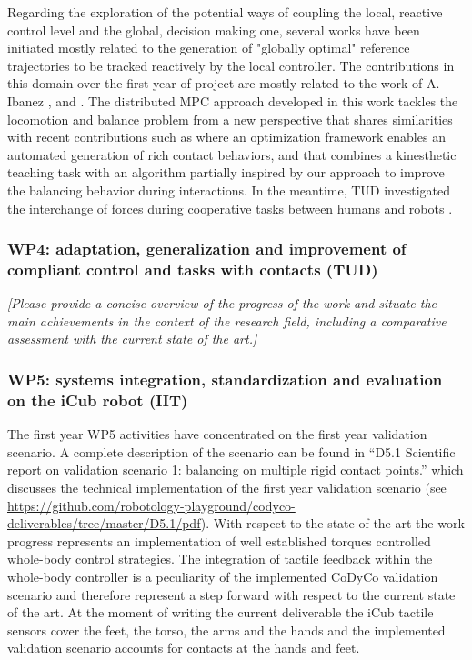 \documentclass[12pt,a4paper,twoside]{article}
\begin{document}
Regarding the exploration of the potential ways of coupling the local, reactive control level and the global, decision making one, several works have been initiated mostly related to the generation of "globally optimal" reference trajectories to be tracked reactively by the local controller. The contributions in this domain over the first year of project are mostly related to the work of A. Ibanez \cite{ibanez2013}, \cite{ibanez2014-icra} and \cite{ibanez2014-ark}. The distributed MPC approach developed in this work tackles the locomotion and balance problem from a new perspective that shares similarities with recent contributions such as \cite{mordatch2012} where an optimization framework enables an automated generation of rich contact behaviors, and \cite{ott2013} that combines a kinesthetic teaching task with an algorithm partially inspired by our approach to improve the balancing behavior during interactions. In the meantime, TUD investigated the interchange of forces during cooperative tasks between humans and robots \cite{berger2013}.

\subsubsection{WP4: adaptation, generalization and improvement of compliant control and tasks with contacts (TUD)}

\emph{\color{red}[Please provide a concise overview of the progress of the work and situate the main achievements in the context of the research field, including a comparative assessment with the current state of the art.]}

\subsubsection{WP5: systems integration, standardization and evaluation on the iCub robot (IIT)}

The first year WP5 activities have concentrated on the first year validation scenario. A complete description of the scenario can be found in ``D5.1 Scientific report on validation scenario 1: balancing on multiple rigid contact points.'' which discusses the technical implementation of the first year validation scenario (see \url{https://github.com/robotology-playground/codyco-deliverables/tree/master/D5.1/pdf}). With respect to the state of the art the work progress represents an implementation of well established torques controlled whole-body control strategies. The integration of tactile feedback within the whole-body controller is a peculiarity of the implemented CoDyCo validation scenario and therefore represent a step forward with respect to the current state of the art. At the moment of writing the current deliverable the iCub tactile sensors cover the feet, the torso, the arms and the hands and the implemented validation scenario accounts for contacts at the hands and feet.
\end{document}
